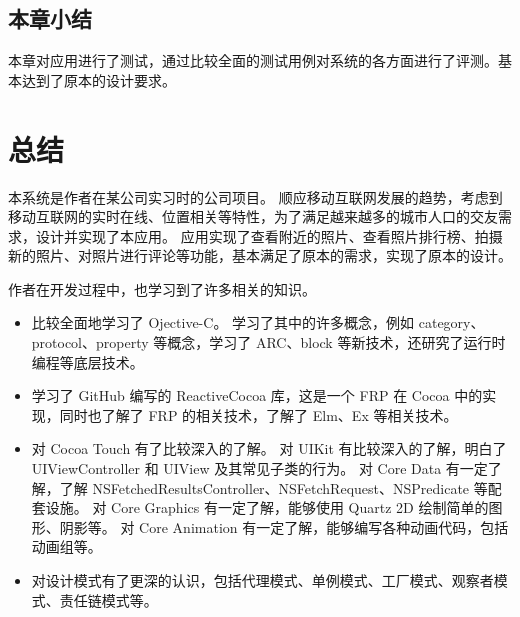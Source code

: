 \section{本章小结}
本章对应用进行了测试，通过比较全面的测试用例对系统的各方面进行了评测。基本达到了原本的设计要求。

\chapter*{总结}
本系统是作者在某公司实习时的公司项目。
顺应移动互联网发展的趋势，考虑到移动互联网的实时在线、位置相关等特性，为了满足越来越多的城市人口的交友需求，设计并实现了本应用。
应用实现了查看附近的照片、查看照片排行榜、拍摄新的照片、对照片进行评论等功能，基本满足了原本的需求，实现了原本的设计。

作者在开发过程中，也学习到了许多相关的知识。
\begin{itemize}
    \item 比较全面地学习了 Ojective-C。
    学习了其中的许多概念，例如 category、protocol、property 等概念，学习了 ARC、block 等新技术，还研究了运行时编程等底层技术。
    \item 学习了 GitHub 编写的 ReactiveCocoa 库，这是一个 FRP 在 Cocoa 中的实现，同时也了解了 FRP 的相关技术，了解了 Elm、Ex 等相关技术。
    \item 对 Cocoa Touch 有了比较深入的了解。
    对 UIKit 有比较深入的了解，明白了 UIViewController 和 UIView 及其常见子类的行为。
    对 Core Data 有一定了解，了解 NSFetchedResultsController、NSFetchRequest、NSPredicate 等配套设施。
    对 Core Graphics 有一定了解，能够使用 Quartz 2D 绘制简单的图形、阴影等。
    对 Core Animation 有一定了解，能够编写各种动画代码，包括动画组等。
    \item 对设计模式有了更深的认识，包括代理模式、单例模式、工厂模式、观察者模式、责任链模式等。
\end{itemize}
